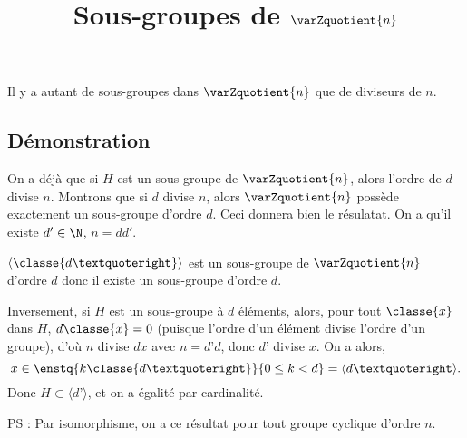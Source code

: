 \documentclass[fontsize=12pt,twoside=false,parskip=half, french]{scrartcl}
\title{Sous-groupes de $\varZquotient{n}$}
\date{}
\author{}
\begin{document}
\maketitle
   \begin{Theoreme}
      Il y a autant de sous-groupes dans $\varZquotient{n}$ que de diviseurs de $n$.
   \end{Theoreme}
   \subsection{Démonstration}
      On a déjà que si $H$ est un sous-groupe de $\varZquotient{n}$, alors l’ordre
      de $d$ divise $n$. Montrons que si $d$ divise $n$, alors $\varZquotient{n}$ 
      possède exactement un sous-groupe d’ordre $d$. Ceci donnera bien le résulatat.
      On a qu'il existe $d' \in \N$, $n = dd'$.
  
      $\langle \classe{d’} \rangle$ est un sous-groupe de $\varZquotient{n}$
      d’ordre $d$ donc il existe un sous-groupe d'ordre $d$.
      
      Inversement, si $H$ est un sous-groupe à $d$ éléments, alors, pour tout 
      $\classe{x}$ dans $H$, $d\classe{x} = 0$ (puisque l’ordre d’un élément
      divise l’ordre d’un groupe), d’où $n$ divise $dx$ avec $n = d’d$, donc
      $d’$ divise $x$. On a alors,
      \[
         x \in \enstq{k\classe{d’}}{ 0 \leq k < d} = \langle d’ \rangle.
      \]
      Donc $H \subset \langle d’ \rangle$, et on a égalité par cardinalité.
      
      PS : Par isomorphisme, on a ce résultat pour tout groupe cyclique d’ordre $n$.
\end{document}
